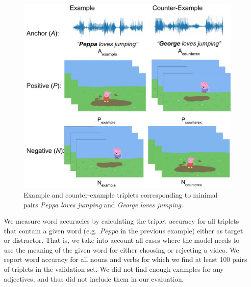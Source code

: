 \begin{figure}[ht]
  \centering
  \includegraphics[width=\columnwidth]{peppa_targeted_triplets.pdf}
  \caption{Example and counter-example triplets corresponding to minimal pairs {\it Peppa loves jumping} and {\it George loves jumping}.}
  \label{fig:minimal_pairs}
\end{figure}

We measure word accuracies by calculating the triplet accuracy 
for all triplets that contain a given word (e.g.\ 
\textit{Peppa} in the previous example) either as target or distractor. 
That is, we take into account all cases where the model needs to use 
the meaning of the given word for either choosing or rejecting a video. 
%
We report word accuracy for all nouns and verbs for which we find at least 
100 pairs of triplets in the validation set. We did not find enough examples for any 
adjectives, and thus did not include them in our evaluation.



